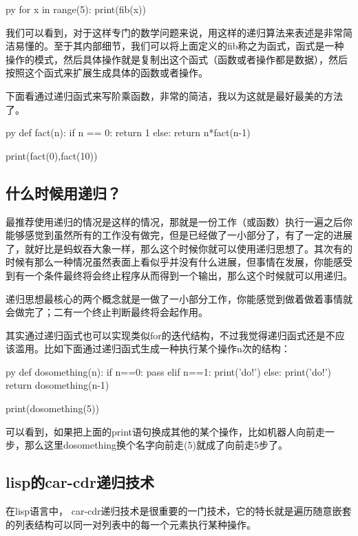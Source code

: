 \documentclass[12pt,oneside]{book}
\begin{document}
\begin{common-format}
\begin{xverbatim}[129]{py}
for x in range(5):
    print(fib(x))
\end{xverbatim}
我们可以看到，对于这样专门的数学问题来说，用这样的递归算法来表述是非常简洁易懂的。至于其内部细节，我们可以将上面定义的fib称之为函式，函式是一种操作的模式，然后具体操作就是复制出这个函式（函数或者操作都是数据），然后按照这个函式来扩展生成具体的函数或者操作。

下面看通过递归函式来写阶乘函数，非常的简洁，我以为这就是最好最美的方法了。
\begin{xverbatim}[129]{py}
def fact(n):
    if n == 0:
        return 1
    else:
        return n*fact(n-1)
        
print(fact(0),fact(10))
\end{xverbatim}

\subsection{什么时候用递归？}
最推荐使用递归的情况是这样的情况，那就是一份工作（或函数）执行一遍之后你能够感觉到虽然所有的工作没有做完，但是已经做了一小部分了，有了一定的进展了，就好比是蚂蚁吞大象一样，那么这个时候你就可以使用递归思想了。其次有的时候有那么一种情况虽然表面上看似乎并没有什么进展，但事情在发展，你能感受到有一个条件最终将会终止程序从而得到一个输出，那么这个时候就可以用递归。

递归思想最核心的两个概念就是一做了一小部分工作，你能感觉到做着做着事情就会做完了；二有一个终止判断最终将会起作用。

其实通过递归函式也可以实现类似for的迭代结构，不过我觉得递归函式还是不应该滥用。比如下面通过递归函式生成一种执行某个操作n次的结构：

\begin{xverbatim}[129]{py}
def dosomething(n):
    if n==0:
        pass
    elif n==1:
        print('do!')
    else:
        print('do!')
        return dosomething(n-1)

print(dosomething(5))
\end{xverbatim}
可以看到，如果把上面的print语句换成其他的某个操作，比如机器人向前走一步，那么这里dosomething换个名字向前走(5)就成了向前走5步了。

\subsection{lisp的car-cdr递归技术}
在lisp语言中， car-cdr递归技术是很重要的一门技术，它的特长就是遍历随意嵌套的列表结构可以同一对列表中的每一个元素执行某种操作。


\end{common-format}
\end{document}
